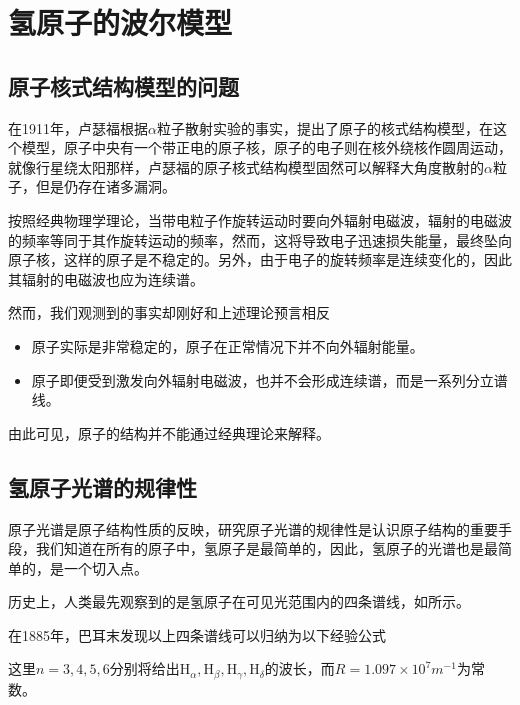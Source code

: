 \section{氢原子的波尔模型}
\label{sec:氢原子的波尔模型}
\subsection{原子核式结构模型的问题}
\label{subsec:原子核式结构模型的问题}
在1911年，卢瑟福根据$\alpha$粒子散射实验的事实，提出了原子的核式结构模型，在这个模型，原子中央有一个带正电的原子核，原子的电子则在核外绕核作圆周运动，就像行星绕太阳那样，卢瑟福的原子核式结构模型固然可以解释大角度散射的$\alpha$粒子，但是仍存在诸多漏洞。

按照经典物理学理论，当带电粒子作旋转运动时要向外辐射电磁波，辐射的电磁波的频率等同于其作旋转运动的频率，然而，这将导致电子迅速损失能量，最终坠向原子核，这样的原子是不稳定的。另外，由于电子的旋转频率是连续变化的，因此其辐射的电磁波也应为连续谱。

然而，我们观测到的事实却刚好和上述理论预言相反
\begin{itemize}
    \item 原子实际是非常稳定的，原子在正常情况下并不向外辐射能量。
    \item 原子即便受到激发向外辐射电磁波，也并不会形成连续谱，而是一系列分立谱线。
\end{itemize}
由此可见，原子的结构并不能通过经典理论来解释。

\subsection{氢原子光谱的规律性}
\label{subsec:氢原子光谱的规律性}
原子光谱是原子结构性质的反映，研究原子光谱的规律性是认识原子结构的重要手段，我们知道在所有的原子中，氢原子是最简单的，因此，氢原子的光谱也是最简单的，是一个切入点。

历史上，人类最先观察到的是氢原子在可见光范围内的四条谱线，如所示。

在1885年，巴耳末发现以上四条谱线可以归纳为以下经验公式
这里$n=3,4,5,6$分别将给出$\text{H}_{\alpha},\text{H}_{\beta},\text{H}_{\gamma},\text{H}_{\delta}$的波长，而$R=1.097\times 10^{7}\si{m^{-1}}$为常数。

